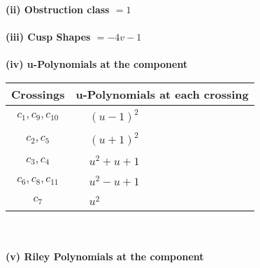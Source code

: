 \documentclass[1p]{elsarticle_modified}
\theoremstyle{definition}
\begin{document}
\flushleft \textbf{(ii) Obstruction class $= 1$}\\~\\
\flushleft \textbf{(iii) Cusp Shapes $= -4 v-1$}\\~\\
\newpage\renewcommand{\arraystretch}{1}
\flushleft \textbf{(iv) u-Polynomials at the component}\newline \\
\begin{tabular}{m{50pt}|m{274pt}}
Crossings & \hspace{64pt}u-Polynomials at each crossing \\
\hline $$\begin{aligned}c_{1},c_{9},c_{10}\end{aligned}$$&$\begin{aligned}
&(u-1)^2
\end{aligned}$\\
\hline $$\begin{aligned}c_{2},c_{5}\end{aligned}$$&$\begin{aligned}
&(u+1)^2
\end{aligned}$\\
\hline $$\begin{aligned}c_{3},c_{4}\end{aligned}$$&$\begin{aligned}
&u^2+u+1
\end{aligned}$\\
\hline $$\begin{aligned}c_{6},c_{8},c_{11}\end{aligned}$$&$\begin{aligned}
&u^2- u+1
\end{aligned}$\\
\hline $$\begin{aligned}c_{7}\end{aligned}$$&$\begin{aligned}
&u^2
\end{aligned}$\\
\hline
\end{tabular}\\~\\
\newpage\renewcommand{\arraystretch}{1}
\flushleft \textbf{(v) Riley Polynomials at the component}\newline \\
\end{document}
